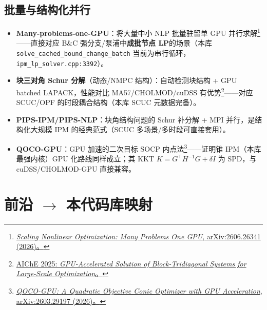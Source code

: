 \documentclass[11pt,a4paper]{ctexart}
\newcommand{\file}[1]{\texttt{#1}}
\newcommand{\func}[1]{\texttt{#1}}
\begin{document}
\subsection{批量与结构化并行}
\begin{itemize}[leftmargin=2em]
  \item \textbf{Many-problems-one-GPU}：将大量中小 NLP 批量驻留单 GPU 并行求解\footnote{\href{https://arxiv.org/html/2606.26341v1}{\emph{Scaling Nonlinear Optimization: Many Problems One GPU}, arXiv:2606.26341 (2026)。}}——直接对应 B\&C 强分支/泵浦中\textbf{成批节点 LP}的场景（本库 \func{solve\_cached\_bound\_change\_batch} 当前为串行循环，\file{ipm\_lp\_solver.cpp:3392}）。
  \item \textbf{块三对角 Schur 分解}（动态/NMPC 结构）：自动检测块结构 + GPU batched LAPACK，性能对比 MA57/CHOLMOD/cuDSS 有优势\footnote{\href{https://proceedings.aiche.org/conferences/aiche-annual-meeting/2025/proceeding/paper/gpu-accelerated-solution-block}{AIChE 2025: \emph{GPU-Accelerated Solution of Block-Tridiagonal Systems for Large-Scale Optimization}。}}——对应 SCUC/OPF 的时段耦合结构（本库 SCUC 元数据完备）。
  \item \textbf{PIPS-IPM/PIPS-NLP}：块角结构问题的 Schur 补分解 + MPI 并行，是结构化大规模 IPM 的经典范式（SCUC 多场景/多时段可直接套用）。
  \item \textbf{QOCO-GPU}：GPU 加速的二次目标 SOCP 内点法\footnote{\href{https://arxiv.org/html/2603.29197v1}{\emph{QOCO-GPU: A Quadratic Objective Conic Optimizer with GPU Acceleration}, arXiv:2603.29197 (2026)。}}——证明锥 IPM（本库最强内核）GPU 化路线同样成立；其 KKT $K=G^{\top}H^{-1}G+\delta I$ 为 SPD，与 cuDSS/CHOLMOD-GPU 直接兼容。
\end{itemize}

\section{前沿 $\to$ 本代码库映射}
\end{document}
